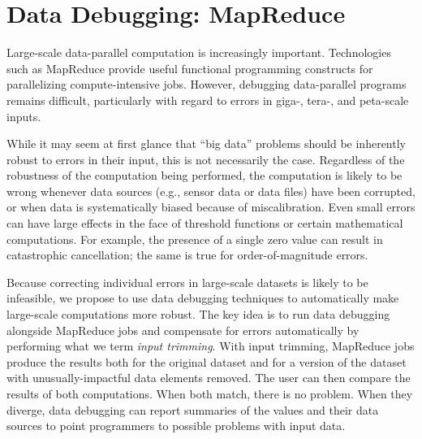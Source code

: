 \section{Data Debugging: MapReduce}

Large-scale data-parallel computation is increasingly important.
Technologies such as MapReduce provide useful functional programming
constructs for parallelizing compute-intensive jobs.  However,
debugging data-parallel programs remains difficult, particularly with
regard to errors in giga-, tera-, and peta-scale inputs. 

While it may seem at first glance that ``big data'' problems should be
inherently robust to errors in their input, this is not necessarily
the case. Regardless of the robustness of the computation being
performed, the computation is likely to be wrong whenever data sources
(e.g., sensor data or data files) have been corrupted, or when data is
systematically biased because of miscalibration. Even small errors can
have large effects in the face of threshold functions or certain
mathematical computations. For example, the presence of a single zero
value can result in catastrophic cancellation; the same is true for
order-of-magnitude errors.

Because correcting individual errors in large-scale datasets is likely
to be infeasible, we propose to use data debugging techniques to
automatically make large-scale computations more robust. The key idea
is to run data debugging alongside MapReduce jobs and compensate for
errors automatically by performing what we term \emph{input
  trimming}. With input trimming, MapReduce jobs produce the results
both for the original dataset and for a version of the dataset with
unusually-impactful data elements removed. The user can then compare
the results of both computations. When both match, there is no
problem. When they diverge, data debugging can report summaries of the
values and their data sources to point programmers to possible
problems with input data.


